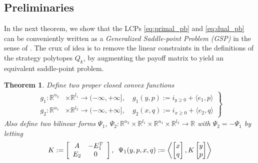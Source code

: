 \documentclass[a4paper,9pt]{extarticle}
\newtheorem{theorem}{Theorem}
\begin{document}
\subsection{Preliminaries}
In the next theorem, we show that the LCPs \eqref{eq:primal_pb}
and \eqref{eq:dual_pb} can be
conveniently written as a \textit{Generalized Saddle-point Problem
  (GSP)} in the sense of \cite{he2013accelerating}. The crux of idea
is to remove the linear constraints in the definitions of the strategy
polytopes $Q_k$, by augmenting the payoff matrix to yield an equivalent
saddle-point problem.
\begin{theorem}
Define two proper closed convex functions
  \begin{eqnarray}
    \left.
    \begin{aligned}
      g_1: \mathbb{R}^{n_2} &\times \mathbb{R}^{l_1} \rightarrow
      (-\infty, +\infty], \hspace{1em} g_1(y, p) :=
        i_{y \ge 0} + \langle e_1,p\rangle\\
        g_2: \mathbb{R}^{n_1} &\times \mathbb{R}^{l_2} \rightarrow
        (-\infty, +\infty],\hspace{1em} g_2(x, q) :=
          i_{x \ge 0} + \langle e_2, q\rangle
    \end{aligned}
    \right\}
    \label{eq:things}
  \end{eqnarray}
Also define two bilinear forms $\Psi_1$, $\Psi_2: \mathbb{R}^{n_2}
\times \mathbb{R}^{l_1} \times \mathbb{R}^{n_1} \times
\mathbb{R}^{l_2} \rightarrow \mathbb{R}$ with $\Psi_2 = -\Psi_1$ by letting
\begin{equation}
  \begin{split}  
    K :=
    \left[
      \begin{array}{cc}
        A & -E_1^T \\
        E_2 & 0
      \end{array}
      \right],\hspace{.5em}
    \Psi_1(y, p, x, q)
    := \left\langle \begin{bmatrix}x\\q\end{bmatrix},
      K\begin{bmatrix}y\\p\end{bmatrix}\right\rangle%
\end{split}
\end{equation}

\end{theorem}
\end{document}
